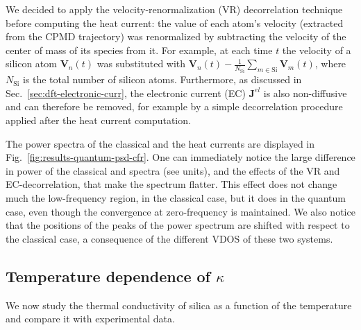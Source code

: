 We decided to apply the velocity-renormalization (VR) decorrelation technique before computing the heat current: the value of each atom's velocity (extracted from the CPMD trajectory) was renormalized by subtracting the velocity of the center of mass of its species from it. 
For example, at each time $t$ the velocity of a silicon atom $\mathbf{V}_n(t)$ was substituted with $\mathbf{V}_n(t)-\frac{1}{N_\mathrm{Si}}\sum_{m\in \mathrm{Si}}\mathbf{V}_m(t)$, where $N_\mathrm{Si}$ is the total number of silicon atoms. 
Furthermore, as discussed in Sec.~\ref{sec:dft-electronic-curr}, the electronic current (EC) $\mathbf{J}^{el}$ is also non-diffusive and can therefore be removed, for example by a simple decorrelation procedure applied after the heat current computation. 

The power spectra of the classical and the \abinitio heat currents are displayed in Fig.~\ref{fig:results-quantum-psd-cfr}. One can immediately notice the large difference in power of the classical and \abinitio spectra (see units), and the effects of the VR and EC-decorrelation, that make the spectrum flatter. This effect does not change much the low-frequency region, in the classical case, but it does in the quantum case, even though the convergence at zero-frequency is maintained. 
We also notice that the positions of the peaks of the \abinitio power spectrum are shifted with respect to the classical case, a consequence of the different VDOS of these two systems. 



\subsection{Temperature dependence of \texorpdfstring{$\kappa$}{thermal conductivity}} \label{sec:results-quantum-results}
We now study the thermal conductivity of silica as a function of the temperature and compare it with experimental data.


